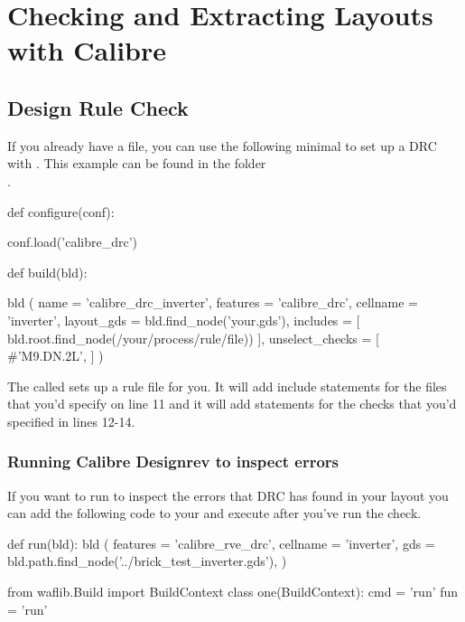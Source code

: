 \section{Checking and Extracting Layouts with Calibre}
\label{sec:calibre_recipes}
\subsection{Design Rule Check}
\label{sec:calibre_recipes_drc}
If you already have a  file, you can use the following minimal
 to set up a \gls{DRC} with .
This example can be found in the folder\\
.
\begin{lstwscript}
def configure(conf):

    conf.load('calibre_drc')

def build(bld):

    bld (
        name = 'calibre_drc_inverter',
        features = 'calibre_drc',
        cellname = 'inverter',
        layout_gds = bld.find_node('your.gds'),
        includes = [
            bld.root.find_node(/your/process/rule/file))
        ],
        unselect_checks = [
            #'M9.DN.2L',
        ]
    )

\end{lstwscript}

The  called  sets up a rule file
for you. It will add include statements for the files that you'd specify
on line 11 and it will add  statements for the checks that
you'd specified in lines 12-14.

\subsubsection{Running Calibre Designrev to inspect errors}
If you want to run  to inspect the errors that \gls{DRC}
has found in your layout you can add the following code to your 
and execute  after you've run the check.

\begin{lstwscript}
def run(bld):
    bld (
        features = 'calibre_rve_drc',
        cellname = 'inverter',
        gds = bld.path.find_node('../brick_test_inverter.gds'),                                                                                                               
    )   

from waflib.Build import BuildContext
class one(BuildContext):
    cmd = 'run'
    fun = 'run'
\end{lstwscript}

